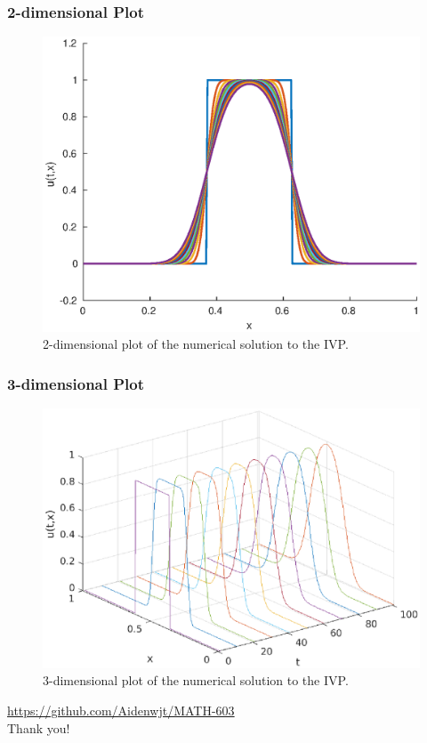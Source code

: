 \documentclass{beamer}
\begin{document}
\begin{frame}
	\frametitle{2-dimensional Plot}
	\begin{figure}[ht]
		\centering
		\includegraphics[scale=0.65]{../write-up/heat_eq_2d}
		\caption{2-dimensional plot of the numerical solution to the IVP.}
	\end{figure}
\end{frame}
\begin{frame}
	\frametitle{3-dimensional Plot}
	\begin{figure}[ht]
		\centering
		\includegraphics[scale=0.65]{../write-up/heat_eq_3d}
		\caption{3-dimensional plot of the numerical solution to the IVP.}
	\end{figure}
\end{frame}

\begin{frame}
	\begin{center}
		\url{https://github.com/Aidenwjt/MATH-603} \\
		Thank you!
	\end{center}
\end{frame}
\end{document}
